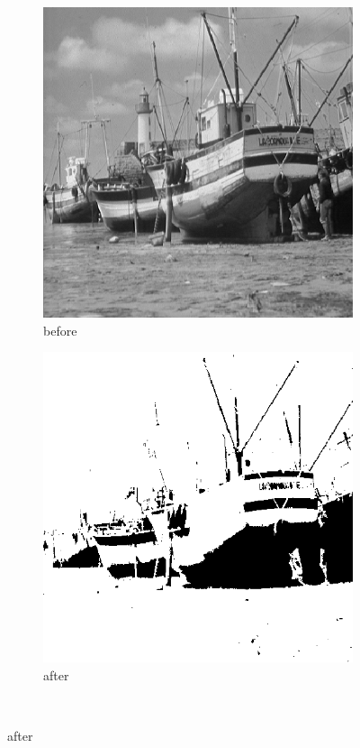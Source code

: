 \documentclass[12pt]{article}
\renewcommand{\subfiguresize}{.25\textwidth}
\begin{document}
\begin{figure}[h]\centering
    \begin{subfigure}[t]{\subfiguresize}
        \includegraphics[width=\textwidth]{img/magda/boat.png}
        \caption{before}
    \end{subfigure}
    \hspace{2em}
    \begin{subfigure}[t]{\subfiguresize}
        \includegraphics[width=\textwidth]{img/magda/region_output.png}
        \caption{after}
    \end{subfigure}\\[2em]


\end{figure}
\end{document}
